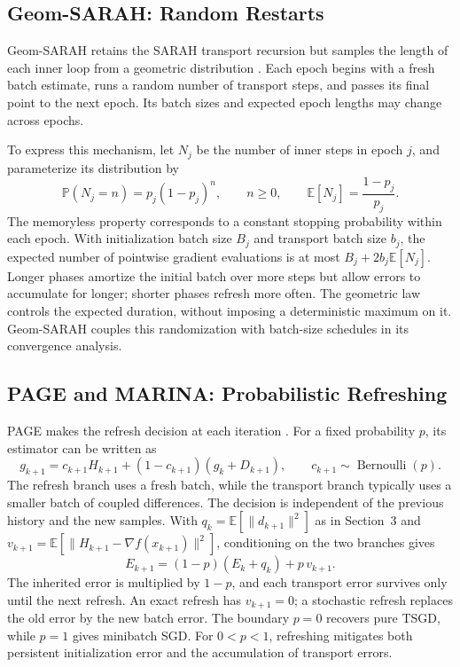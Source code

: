 \subsection{Geom-SARAH: Random Restarts}
\label{subsec:random-restarts}

Geom-SARAH retains the SARAH transport recursion but samples the length
of each inner loop from a geometric distribution
\citep{horvath2022adaptivity}. Each epoch begins with a fresh batch
estimate, runs a random number of transport steps, and passes its final
point to the next epoch. Its batch sizes and expected epoch lengths may
change across epochs.

To express this mechanism, let $N_j$ be the number of inner steps in
epoch $j$, and parameterize its distribution by
\[
\mathbb P(N_j=n)=p_j(1-p_j)^n,\qquad n\geq0,
\qquad \mathbb E[N_j]=\frac{1-p_j}{p_j}.
\]
The memoryless property corresponds to a constant stopping probability
within each epoch. With initialization batch size $B_j$ and transport
batch size $b_j$, the expected number of pointwise gradient evaluations
is at most $B_j+2b_j\mathbb E[N_j]$. Longer phases amortize the initial
batch over more steps but allow errors to accumulate for longer;
shorter phases refresh more often. The geometric law controls the
expected duration, without imposing a deterministic maximum on it.
Geom-SARAH couples this randomization with batch-size schedules in its
convergence analysis.

\subsection{PAGE and MARINA: Probabilistic Refreshing}
\label{subsec:probabilistic-refreshing}

PAGE makes the refresh decision at each iteration
\citep{li2021page}. For a fixed probability $p$, its estimator can be
written as
\begin{equation}
\label{eq:page-refresh-transport}
g_{k+1}=c_{k+1}H_{k+1}
       +(1-c_{k+1})(g_k+D_{k+1}),
\qquad c_{k+1}\sim\operatorname{Bernoulli}(p).
\end{equation}
The refresh branch uses a fresh batch, while the transport branch
typically uses a smaller batch of coupled differences. The decision is
independent of the previous history and the new samples. With
$q_k=\mathbb E[\|d_{k+1}\|^2]$ as in Section~3 and
$v_{k+1}=\mathbb E[\|H_{k+1}-\nabla f(x_{k+1})\|^2]$, conditioning on
the two branches gives
\begin{equation}
\label{eq:refresh-error-recursion}
E_{k+1}=(1-p)(E_k+q_k)+p\,v_{k+1}.
\end{equation}
The inherited error is multiplied by $1-p$, and each transport error
survives only until the next refresh. An exact refresh has $v_{k+1}=0$;
a stochastic refresh replaces the old error by the new batch error.
The boundary $p=0$ recovers pure TSGD, while $p=1$ gives minibatch SGD.
For $0<p<1$, refreshing mitigates both persistent initialization error
and the accumulation of transport errors.

